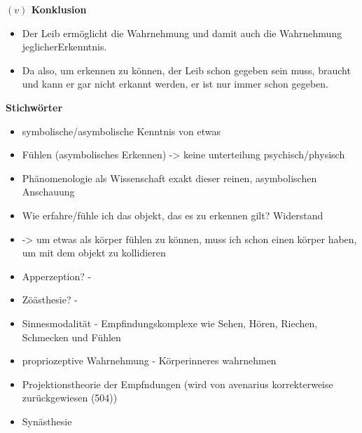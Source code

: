 \documentclass[a4paper, 12pt]{article}
\begin{document}
\begin{onehalfspace}
\vspace{5mm}
\noindent\textbf{$(v)$ Konklusion}

\begin{itemize}
  \item Der Leib ermöglicht die Wahrnehmung und damit auch die Wahrnehmung jeglicherErkenntnis.
  \item Da also, um erkennen zu können, der Leib schon gegeben sein muss, braucht und kann er gar nicht erkannt werden, er ist nur immer schon gegeben.
\end{itemize}


\vspace{5mm}
\noindent\textbf{Stichwörter}
\begin{itemize}
  \item symbolische/asymbolische Kenntnis von etwas
  \item Fühlen (asymbolisches Erkennen) -> keine unterteilung psychisch/physisch
  \item Phänomenologie als Wissenschaft exakt dieser reinen, asymbolischen Anschauung
  \item Wie erfahre/fühle ich das objekt, das es zu erkennen gilt? Widerstand
  \item -> um etwas als körper fühlen zu können, muss ich schon einen körper haben, um mit dem objekt zu kollidieren 
  \item Apperzeption? - 
  \item Zöästhesie? - 
  \item Sinnesmodalität - Empfindungskomplexe wie Sehen, Hören, Riechen, Schmecken und Fühlen
  \item propriozeptive Wahrnehmung - Körperinneres wahrnehmen
  \item Projektionstheorie der Empfndungen (wird von avenarius korrekterweise zurückgewiesen (504))
  \item Synästhesie
\end{itemize}



\newpage

\end{onehalfspace}
\nocite{*}
\printbibliography
\end{document}
